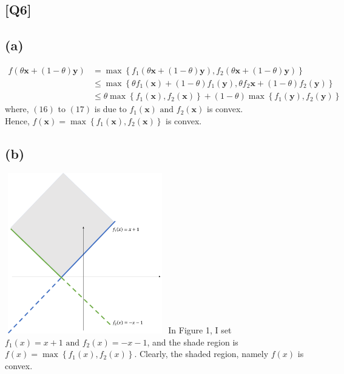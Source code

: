 \documentclass[12pt, a4 paper]{article}
\begin{document}
    \begin{framed}
        \section{[Q6]}
        \subsection{(a)}
        \begin{align}
        f(\theta \boldsymbol{x} + (1-\theta) \boldsymbol{y}) &= \max \left\{f_{1} (\theta \boldsymbol{x} + (1-\theta) \boldsymbol{y}),
          f_2 (\theta \boldsymbol{x} + (1-\theta) \boldsymbol{y}) \right\} \\
         &\leq \max \left\{ \theta f_1(\boldsymbol{x}) + (1-\theta) f_1({\boldsymbol{y}}),
         \theta f_2{\boldsymbol{x}} + (1-\theta) f_2({\boldsymbol{y}}) \right\} \\
         &\leq \theta \max \left\{ f_1(\boldsymbol{x}), f_2(\boldsymbol{x}) \right\} + (1-\theta) \max
         \left\{ f_1(\boldsymbol{y}), f_2(\boldsymbol{y})\right\}
        \end{align}
        \indent where, $(16)$ to $(17)$ is due to $f_1(\boldsymbol{x}) \text{ and } 
        f_2(\boldsymbol{x})$ is convex.\\
        \indent Hence, $f(\boldsymbol{x}) = \max \left\{ f_1(\boldsymbol{x}),
        f_2(\boldsymbol{x}) \right\}$ is convex.


    \subsection{(b)}
    {\centering
    \includegraphics[width=7cm, height=7cm]{1.png}
    }
    In Figure 1, I set $f_1(x) = x+1 \text{ and } f_2(x) = -x-1$, and the shade region is
    $f(x) = \max \left\{ f_1(x), f_2(x) \right\}$. Clearly, the shaded region, namely $f(x)$ 
    is convex.


\end{framed}
\end{document}
